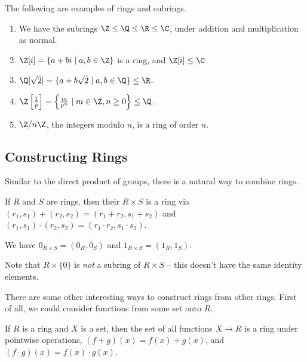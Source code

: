  \begin{example}
	 The following are examples of rings and subrings.
	 \begin{enumerate}[label=(\roman*)]
		 \item We have the subrings $\Z \leq \Q \leq \R \leq \C$, under addition and multiplication as normal.
		 \item $\Z[i] = \{a + bi \mid a, b \in \Z\}$ is a ring, and $\Z[i] \leq \C$.
		 \item $\Q[\sqrt{2}] = \{a + b\sqrt{2} \mid a, b \in \Q\} \leq \R$.
		 \item $\Z\left[\frac{1}{p}\right] = \left\{
			\frac{m}{p^n} \mid m \in \Z, n \geq 0
		 \right\} \leq \Q$.
		\item $\Z/n\Z$, the integers modulo $n$, is a ring of order $n$.
	 \end{enumerate}
 \end{example}


 \subsection{Constructing Rings}

 Similar to the direct product of groups, there is a natural way to combine rings.

 \begin{definition}
	 If $R$ and $S$ are rings, then their  $R \times S$ is a ring via $(r_1, s_1) + (r_2, s_2) = (r_1 + r_2, s_1 + s_2)$ and $(r_1, s_1) \cdot (r_2, s_2) = (r_1 \cdot r_2, s_1 \cdot s_2)$.

	We have $0_{R \times S} = (0_R, 0_S)$ and $1_{R \times S} = (1_R, 1_S)$.
 \end{definition}

 \begin{remark}
	 Note that $R \times \{0 \}$ is \emph{not} a subring of $R \times S$ -- this doesn't have the same identity elements.
 \end{remark}

 There are some other interesting ways to construct rings from other rings. First of all, we could consider functions from some set onto $R$.

 \begin{definition}
	If $R$ is a ring and $X$ is a set, then the set of all functions $X \rightarrow R$ is a ring under pointwise operations, $(f + g)(x) = f(x) + g(x)$, and $(f \cdot g)(x) = f(x) \cdot g(x)$.  
 \end{definition}

